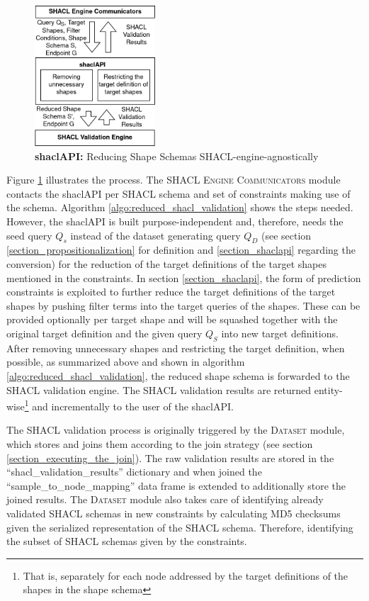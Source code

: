 \begin{figure}
    \centering
    \includegraphics[width=0.4\textwidth]{images/implementation/shacl_api.png}
    \caption{\textbf{shaclAPI:} Reducing Shape Schemas SHACL-engine-agnostically}
    \label{fig:shacl_api}
\end{figure}

Figure \ref{fig:shacl_api} illustrates the process. The \textsc{SHACL Engine Communicators} module contacts the shaclAPI per SHACL schema and set of constraints making use of the schema. Algorithm \ref{algo:reduced_shacl_validation} shows the steps needed. However, the shaclAPI is built purpose-independent and, therefore, needs the seed query $Q_s$ instead of the dataset generating query $Q_D$ (see section \ref{section_propositionalization} for definition and \ref{section_shaclapi} regarding the conversion) for the reduction of the target definitions of the target shapes mentioned in the constraints. In section \ref{section_shaclapi}, the form of prediction constraints is exploited to further reduce the target definitions of the target shapes by pushing filter terms into the target queries of the shapes. These can be provided optionally per target shape and will be squashed together with the original target definition and the given query $Q_S$ into new target definitions. After removing unnecessary shapes and restricting the target definition, when possible, as summarized above and shown in algorithm \ref{algo:reduced_shacl_validation}, the reduced shape schema is forwarded to the SHACL validation engine. The SHACL validation results are returned entity-wise\footnote{That is, separately for each node addressed by the target definitions of the shapes in the shape schema} and incrementally to the user of the shaclAPI. 

The SHACL validation process is originally triggered by the \textsc{Dataset} module, which stores and joins them according to the join strategy (see section \ref{section_executing_the_join}). The raw validation results are stored in the ``shacl\_validation\_results'' dictionary and when joined the ``sample\_to\_node\_mapping'' data frame is extended to additionally store the joined results. The \textsc{Dataset} module also takes care of identifying already validated SHACL schemas in new constraints by calculating MD5 checksums given the serialized representation of the SHACL schema. Therefore, identifying the subset of SHACL schemas given by the constraints.

